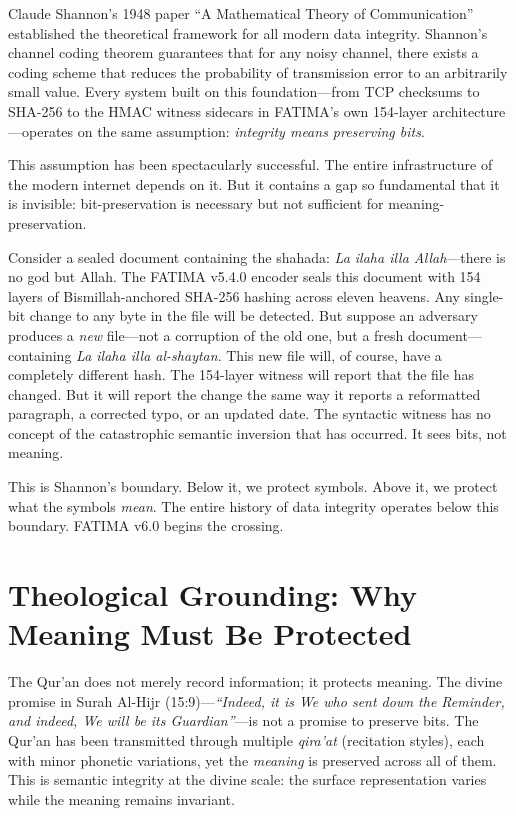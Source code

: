 \documentclass[11pt,a4paper]{article}
\begin{document}
Claude Shannon's 1948 paper ``A Mathematical Theory of Communication'' \cite{shannon1948} established the theoretical framework for all modern data integrity. Shannon's channel coding theorem guarantees that for any noisy channel, there exists a coding scheme that reduces the probability of transmission error to an arbitrarily small value. Every system built on this foundation---from TCP checksums to SHA-256 to the HMAC witness sidecars in FATIMA's own 154-layer architecture---operates on the same assumption: \textit{integrity means preserving bits}.

This assumption has been spectacularly successful. The entire infrastructure of the modern internet depends on it. But it contains a gap so fundamental that it is invisible: bit-preservation is necessary but not sufficient for meaning-preservation.

Consider a sealed document containing the shahada: \textit{La ilaha illa Allah}---there is no god but Allah. The FATIMA v5.4.0 encoder seals this document with 154 layers of Bismillah-anchored SHA-256 hashing across eleven heavens. Any single-bit change to any byte in the file will be detected. But suppose an adversary produces a \textit{new} file---not a corruption of the old one, but a fresh document---containing \textit{La ilaha illa al-shaytan}. This new file will, of course, have a completely different hash. The 154-layer witness will report that the file has changed. But it will report the change the same way it reports a reformatted paragraph, a corrected typo, or an updated date. The syntactic witness has no concept of the catastrophic semantic inversion that has occurred. It sees bits, not meaning.

This is Shannon's boundary. Below it, we protect symbols. Above it, we protect what the symbols \textit{mean}. The entire history of data integrity operates below this boundary. FATIMA v6.0 begins the crossing.


\section{Theological Grounding: Why Meaning Must Be Protected}

The Qur'an does not merely record information; it protects meaning. The divine promise in Surah Al-Hijr (15:9)---\textit{``Indeed, it is We who sent down the Reminder, and indeed, We will be its Guardian''}---is not a promise to preserve bits. The Qur'an has been transmitted through multiple \textit{qira'at} (recitation styles), each with minor phonetic variations, yet the \textit{meaning} is preserved across all of them. This is semantic integrity at the divine scale: the surface representation varies while the meaning remains invariant.
\end{document}
